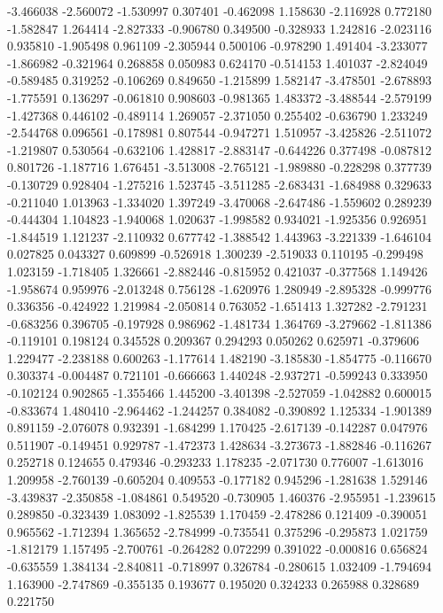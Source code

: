 -3.466038
-2.560072
-1.530997
0.307401
-0.462098
1.158630
-2.116928
0.772180
-1.582847
1.264414
-2.827333
-0.906780
0.349500
-0.328933
1.242816
-2.023116
0.935810
-1.905498
0.961109
-2.305944
0.500106
-0.978290
1.491404
-3.233077
-1.866982
-0.321964
0.268858
0.050983
0.624170
-0.514153
1.401037
-2.824049
-0.589485
0.319252
-0.106269
0.849650
-1.215899
1.582147
-3.478501
-2.678893
-1.775591
0.136297
-0.061810
0.908603
-0.981365
1.483372
-3.488544
-2.579199
-1.427368
0.446102
-0.489114
1.269057
-2.371050
0.255402
-0.636790
1.233249
-2.544768
0.096561
-0.178981
0.807544
-0.947271
1.510957
-3.425826
-2.511072
-1.219807
0.530564
-0.632106
1.428817
-2.883147
-0.644226
0.377498
-0.087812
0.801726
-1.187716
1.676451
-3.513008
-2.765121
-1.989880
-0.228298
0.377739
-0.130729
0.928404
-1.275216
1.523745
-3.511285
-2.683431
-1.684988
0.329633
-0.211040
1.013963
-1.334020
1.397249
-3.470068
-2.647486
-1.559602
0.289239
-0.444304
1.104823
-1.940068
1.020637
-1.998582
0.934021
-1.925356
0.926951
-1.844519
1.121237
-2.110932
0.677742
-1.388542
1.443963
-3.221339
-1.646104
0.027825
0.043327
0.609899
-0.526918
1.300239
-2.519033
0.110195
-0.299498
1.023159
-1.718405
1.326661
-2.882446
-0.815952
0.421037
-0.377568
1.149426
-1.958674
0.959976
-2.013248
0.756128
-1.620976
1.280949
-2.895328
-0.999776
0.336356
-0.424922
1.219984
-2.050814
0.763052
-1.651413
1.327282
-2.791231
-0.683256
0.396705
-0.197928
0.986962
-1.481734
1.364769
-3.279662
-1.811386
-0.119101
0.198124
0.345528
0.209367
0.294293
0.050262
0.625971
-0.379606
1.229477
-2.238188
0.600263
-1.177614
1.482190
-3.185830
-1.854775
-0.116670
0.303374
-0.004487
0.721101
-0.666663
1.440248
-2.937271
-0.599243
0.333950
-0.102124
0.902865
-1.355466
1.445200
-3.401398
-2.527059
-1.042882
0.600015
-0.833674
1.480410
-2.964462
-1.244257
0.384082
-0.390892
1.125334
-1.901389
0.891159
-2.076078
0.932391
-1.684299
1.170425
-2.617139
-0.142287
0.047976
0.511907
-0.149451
0.929787
-1.472373
1.428634
-3.273673
-1.882846
-0.116267
0.252718
0.124655
0.479346
-0.293233
1.178235
-2.071730
0.776007
-1.613016
1.209958
-2.760139
-0.605204
0.409553
-0.177182
0.945296
-1.281638
1.529146
-3.439837
-2.350858
-1.084861
0.549520
-0.730905
1.460376
-2.955951
-1.239615
0.289850
-0.323439
1.083092
-1.825539
1.170459
-2.478286
0.121409
-0.390051
0.965562
-1.712394
1.365652
-2.784999
-0.735541
0.375296
-0.295873
1.021759
-1.812179
1.157495
-2.700761
-0.264282
0.072299
0.391022
-0.000816
0.656824
-0.635559
1.384134
-2.840811
-0.718997
0.326784
-0.280615
1.032409
-1.794694
1.163900
-2.747869
-0.355135
0.193677
0.195020
0.324233
0.265988
0.328689
0.221750
